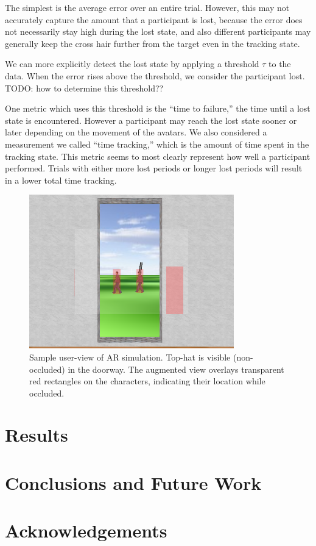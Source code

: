 \documentclass{acmsiggraph}                     %
\begin{document}
The simplest is the average error over an entire trial.  However, this may not accurately capture the amount that a participant is lost, because the error does not necessarily stay high during the lost state, and also different participants may generally keep the cross hair further from the target even in the tracking state.

We can more explicitly detect the lost state by applying a threshold $\tau$ to the data.  When the error rises above the threshold, we consider the participant lost.  TODO: how to determine this threshold??

One metric which uses this threshold is the ``time to failure,'' the time until a lost state is encountered.  However a participant may reach the lost state sooner or later depending on the movement of the avatars.  We also considered a measurement we called ``time tracking,'' which is the amount of time spent in the tracking state.  This metric seems to most clearly represent how well a participant performed.  Trials with either more lost periods or longer lost periods will result in a lower total time tracking.

\begin{figure}[ht!]
	\centering
	\includegraphics[width=3.5in]{figures/tophatscreenshot.png}
	\caption{Sample user-view of AR simulation.  Top-hat is visible (non-occluded) in the doorway.  The augmented view overlays transparent red rectangles on the characters, indicating their location while occluded.}
\end{figure}

\section{Results}

\section{Conclusions and Future Work}

\section*{Acknowledgements}


\nocite{*}

\end{document}

